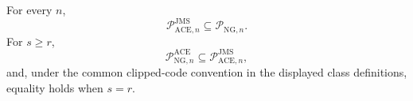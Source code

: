 For every \(n\),
\[
 \mathcal P_{\mathrm{ACE},n}^{\mathrm{JMS}}
 \subseteq \mathcal P_{\mathrm{NG},n}.
\]
For \(s\ge r\),
\[
 \mathcal P_{\mathrm{NG},n}^{\mathrm{ACE}}
 \subseteq \mathcal P_{\mathrm{ACE},n}^{\mathrm{JMS}},
\]
and, under the common clipped-code convention in the displayed class definitions, equality holds when \(s=r\).